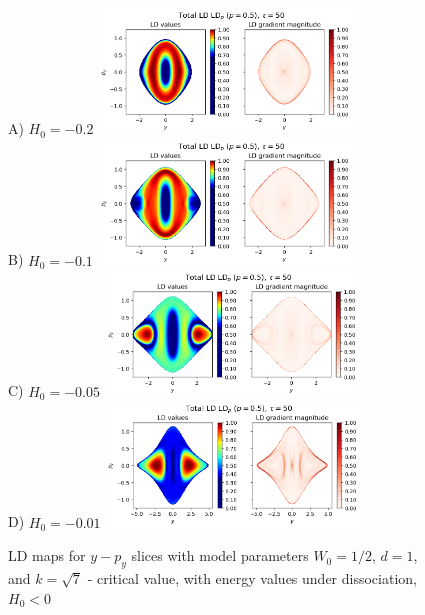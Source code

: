 \documentclass[10pt,aps,onecolumn,superscriptaddress]{revtex4-2}
\begin{document}
\begin{figure}
    \centering
    A) $H_0 = -0.2$ \includegraphics[width=0.6\textwidth]{LD_H0_-0_2_y-py_PES_bifurcation.png}\\
    B) $H_0 = -0.1$ \includegraphics[width=0.6\textwidth]{LD_H0_-0_1_y-py_PES_bifurcation.png}\\
    C) $H_0 = -0.05$ \includegraphics[width=0.6\textwidth]{LD_H0_-0_05_y-py_PES_bifurcation.png}\\
    D) $H_0 = -0.01$ \includegraphics[width=0.6\textwidth]{LD_H0_-0_01_y-py_PES_bifurcation.png}
    \caption{LD maps for $y-p_y$ slices with model parameters $W_0 = 1/2$, $d = 1$, and $k = \sqrt{7}$ - critical value, with energy values under dissociation, $H_0 < 0$}
\end{figure}
\end{document}
